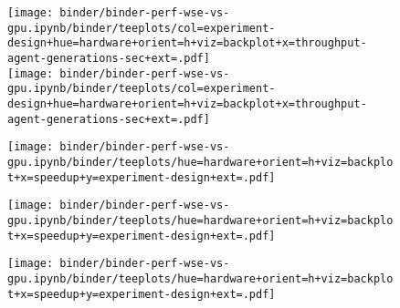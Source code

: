 \begin{figure}

\vspace{-6ex}

\begin{minipage}[b]{0.45\linewidth}

\texttt{[image: binder/binder-perf-wse-vs-gpu.ipynb/binder/teeplots/col=experiment-design+hue=hardware+orient=h+viz=backplot+x=throughput-agent-generations-sec+ext=.pdf]}\\[-0.2ex]
\texttt{[image: binder/binder-perf-wse-vs-gpu.ipynb/binder/teeplots/col=experiment-design+hue=hardware+orient=h+viz=backplot+x=throughput-agent-generations-sec+ext=.pdf]}

  \vspace{0.5ex}

\end{minipage}%
\begin{minipage}[b]{0.4\linewidth}
\texttt{[image: binder/binder-perf-wse-vs-gpu.ipynb/binder/teeplots/hue=hardware+orient=h+viz=backplot+x=speedup+y=experiment-design+ext=.pdf]}

\vspace{-1ex}

\texttt{[image: binder/binder-perf-wse-vs-gpu.ipynb/binder/teeplots/hue=hardware+orient=h+viz=backplot+x=speedup+y=experiment-design+ext=.pdf]}

\end{minipage}%
\begin{minipage}[b]{0.15\linewidth}

\texttt{[image: binder/binder-perf-wse-vs-gpu.ipynb/binder/teeplots/hue=hardware+orient=h+viz=backplot+x=speedup+y=experiment-design+ext=.pdf]}

\vspace{-1ex}

\end{minipage}

\vspace{-1ex}
\vspace{-2ex}


\end{figure}
